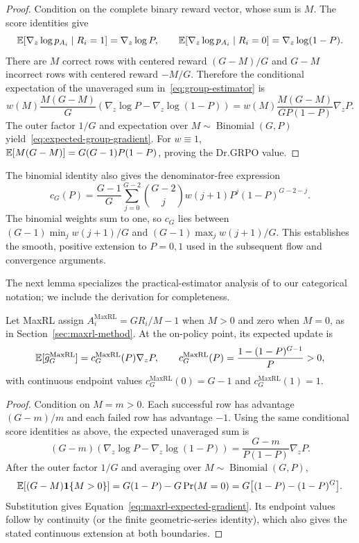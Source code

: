 \begin{proof}
Condition on the complete binary reward vector, whose sum is $M$. The score
identities give
\[
  \mathbb E[\nabla_z\log p_{A_i}\mid R_i=1]=\nabla_z\log P,
  \qquad
  \mathbb E[\nabla_z\log p_{A_i}\mid R_i=0]
  =\nabla_z\log(1-P).
\]
There are $M$ correct rows with centered reward $(G-M)/G$ and $G-M$
incorrect rows with centered reward $-M/G$. Therefore the conditional
expectation of the unaveraged sum in~\eqref{eq:group-estimator} is
\[
  w(M)\frac{M(G-M)}{G}
  \left(\nabla_z\log P-\nabla_z\log(1-P)\right)
  =w(M)\frac{M(G-M)}{GP(1-P)}\nabla_zP.
\]
The outer factor $1/G$ and expectation over
$M\sim\operatorname{Binomial}(G,P)$ yield~\eqref{eq:expected-group-gradient}.
For $w\equiv1$,
$\mathbb E[M(G-M)]=G(G-1)P(1-P)$, proving the Dr.GRPO value.
\end{proof}

The binomial identity also gives the denominator-free expression
\[
 c_G(P)=\frac{G-1}{G}\sum_{j=0}^{G-2}\binom{G-2}{j}
 w(j+1)P^j(1-P)^{G-2-j}.
\]
The binomial weights sum to one, so $c_G$ lies between
$(G-1)\min_j w(j+1)/G$ and $(G-1)\max_j w(j+1)/G$.
This establishes the smooth, positive extension to $P=0,1$ used in the
subsequent flow and convergence arguments.

The next lemma specializes the practical-estimator analysis of
\citet[Section~4.3 and Appendix~D, Theorem~5]{tajwar2026maxrl}
to our categorical notation; we include the derivation for completeness.

\begin{lemma}
\label{lem:maxrl-mean}
Let MaxRL assign
$A_i^{\mathrm{MaxRL}}=GR_i/M-1$ when $M>0$ and zero when $M=0$, as in
Section~\ref{sec:maxrl-method}. At the on-policy point, its expected update is
\begin{equation}
  \mathbb E[\widehat g_G^{\mathrm{MaxRL}}]
  =c_G^{\mathrm{MaxRL}}(P)\nabla_zP,
  \qquad
  c_G^{\mathrm{MaxRL}}(P)
  =\frac{1-(1-P)^{G-1}}{P}>0,
  \label{eq:maxrl-expected-gradient}
\end{equation}
with continuous endpoint values
$c_G^{\mathrm{MaxRL}}(0)=G-1$ and
$c_G^{\mathrm{MaxRL}}(1)=1$.
\end{lemma}

\begin{proof}
Condition on $M=m>0$. Each successful row has advantage $(G-m)/m$ and each
failed row has advantage $-1$. Using the same conditional score identities as
above, the expected unaveraged sum is
\[
  (G-m)\!\left(\nabla_z\log P-\nabla_z\log(1-P)\right)
  =\frac{G-m}{P(1-P)}\nabla_zP.
\]
After the outer factor $1/G$ and averaging over
$M\sim\operatorname{Binomial}(G,P)$,
\[
 \mathbb E[(G-M)\mathbf 1\{M>0\}]
 =G(1-P)-G\Pr(M=0)
 =G\big[(1-P)-(1-P)^G\big].
\]
Substitution gives Equation~\eqref{eq:maxrl-expected-gradient}. Its endpoint
values follow by continuity (or the finite geometric-series identity), which
also gives the stated continuous extension at both boundaries.
\end{proof}

